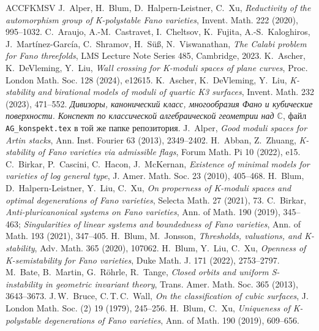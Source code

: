 \documentclass[11pt,a4paper]{article}
\theoremstyle{plain}
\theoremstyle{definition}
\theoremstyle{remark}
\renewcommand{\C}{\mathbb{C}}
\begin{document}
\begin{thebibliography}{ACCFKMSV}
 J.~Alper, H.~Blum, D.~Halpern-Leistner, C.~Xu, \emph{Reductivity of the automorphism group of K-polystable Fano varieties}, Invent. Math. 222 (2020), 995--1032.
 C.~Araujo, A.-M.~Castravet, I.~Cheltsov, K.~Fujita, A.-S.~Kaloghiros, J.~Mart\'inez-Garc\'ia, C.~Shramov, H.~S\"u\ss, N.~Viswanathan, \emph{The Calabi problem for Fano threefolds}, LMS Lecture Note Series 485, Cambridge, 2023.
 K.~Ascher, K.~DeVleming, Y.~Liu, \emph{Wall crossing for K-moduli spaces of plane curves}, Proc. London Math. Soc. 128 (2024), e12615.
 K.~Ascher, K.~DeVleming, Y.~Liu, \emph{K-stability and birational models of moduli of quartic K3 surfaces}, Invent. Math. 232 (2023), 471--552.
 \emph{Дивизоры, канонический класс, многообразия Фано и кубические поверхности. Конспект по классической алгебраической геометрии над $\C$}, файл \texttt{AG\_konspekt.tex} в той же папке репозитория.
 J.~Alper, \emph{Good moduli spaces for Artin stacks}, Ann. Inst. Fourier 63 (2013), 2349--2402.
 H.~Abban, Z.~Zhuang, \emph{K-stability of Fano varieties via admissible flags}, Forum Math. Pi 10 (2022), e15.
 C.~Birkar, P.~Cascini, C.~Hacon, J.~McKernan, \emph{Existence of minimal models for varieties of log general type}, J. Amer. Math. Soc. 23 (2010), 405--468.
 H.~Blum, D.~Halpern-Leistner, Y.~Liu, C.~Xu, \emph{On properness of K-moduli spaces and optimal degenerations of Fano varieties}, Selecta Math. 27 (2021), 73.
 C.~Birkar, \emph{Anti-pluricanonical systems on Fano varieties}, Ann. of Math. 190 (2019), 345--463; \emph{Singularities of linear systems and boundedness of Fano varieties}, Ann. of Math. 193 (2021), 347--405.
 H.~Blum, M.~Jonsson, \emph{Thresholds, valuations, and K-stability}, Adv. Math. 365 (2020), 107062.
 H.~Blum, Y.~Liu, C.~Xu, \emph{Openness of K-semistability for Fano varieties}, Duke Math. J. 171 (2022), 2753--2797.
 M.~Bate, B.~Martin, G.~R\"ohrle, R.~Tange, \emph{Closed orbits and uniform S-instability in geometric invariant theory}, Trans. Amer. Math. Soc. 365 (2013), 3643--3673.
 J.\,W.~Bruce, C.\,T.\,C.~Wall, \emph{On the classification of cubic surfaces}, J. London Math. Soc. (2) 19 (1979), 245--256.
 H.~Blum, C.~Xu, \emph{Uniqueness of K-polystable degenerations of Fano varieties}, Ann. of Math. 190 (2019), 609--656.

\end{thebibliography}
\end{document}
